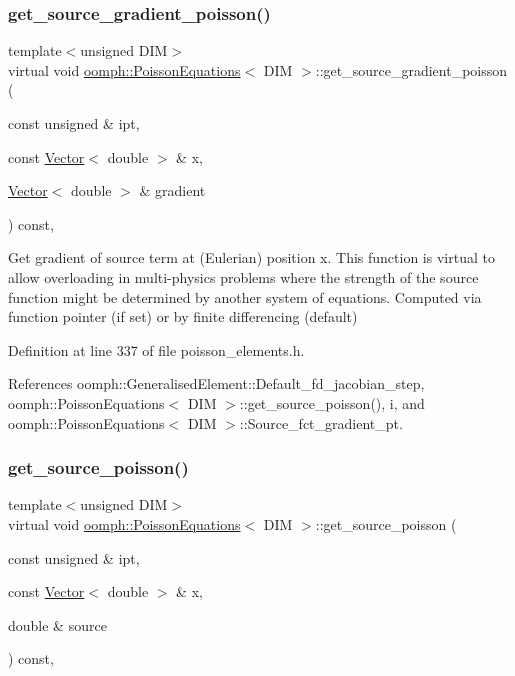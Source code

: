 \subsubsection{\texorpdfstring{get\+\_\+source\+\_\+gradient\+\_\+poisson()}{get\_source\_gradient\_poisson()}}
{\footnotesize\ttfamily template$<$unsigned D\+IM$>$ \\
virtual void \hyperlink{classoomph_1_1PoissonEquations}{oomph\+::\+Poisson\+Equations}$<$ D\+IM $>$\+::get\+\_\+source\+\_\+gradient\+\_\+poisson (\begin{DoxyParamCaption}\item[{const unsigned \&}]{ipt,  }\item[{const \hyperlink{classoomph_1_1Vector}{Vector}$<$ double $>$ \&}]{x,  }\item[{\hyperlink{classoomph_1_1Vector}{Vector}$<$ double $>$ \&}]{gradient }\end{DoxyParamCaption}) const\hspace{0.3cm}{\ttfamily [inline]}, {\ttfamily [virtual]}}

Get gradient of source term at (Eulerian) position x. This function is virtual to allow overloading in multi-\/physics problems where the strength of the source function might be determined by another system of equations. Computed via function pointer (if set) or by finite differencing (default) 

Definition at line 337 of file poisson\+\_\+elements.\+h.



References oomph\+::\+Generalised\+Element\+::\+Default\+\_\+fd\+\_\+jacobian\+\_\+step, oomph\+::\+Poisson\+Equations$<$ D\+I\+M $>$\+::get\+\_\+source\+\_\+poisson(), i, and oomph\+::\+Poisson\+Equations$<$ D\+I\+M $>$\+::\+Source\+\_\+fct\+\_\+gradient\+\_\+pt.

\mbox{\label{classoomph_1_1PoissonEquations_a06dbfe005c721c1562f13a48fb7dfb29}} 
\subsubsection{\texorpdfstring{get\+\_\+source\+\_\+poisson()}{get\_source\_poisson()}}
{\footnotesize\ttfamily template$<$unsigned D\+IM$>$ \\
virtual void \hyperlink{classoomph_1_1PoissonEquations}{oomph\+::\+Poisson\+Equations}$<$ D\+IM $>$\+::get\+\_\+source\+\_\+poisson (\begin{DoxyParamCaption}\item[{const unsigned \&}]{ipt,  }\item[{const \hyperlink{classoomph_1_1Vector}{Vector}$<$ double $>$ \&}]{x,  }\item[{double \&}]{source }\end{DoxyParamCaption}) const\hspace{0.3cm}{\ttfamily [inline]}, {\ttfamily [virtual]}}

